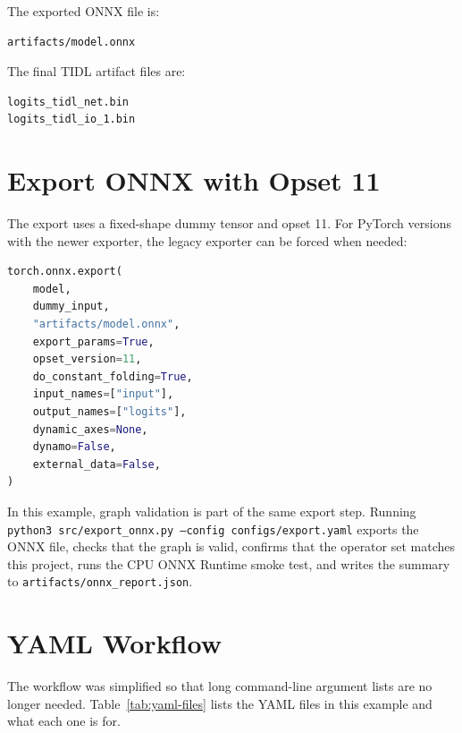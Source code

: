 \documentclass[11pt,a4paper]{article}
\begin{document}
The exported ONNX file is:

\begin{lstlisting}
artifacts/model.onnx
\end{lstlisting}

The final TIDL artifact files are:

\begin{lstlisting}
logits_tidl_net.bin
logits_tidl_io_1.bin
\end{lstlisting}

\section{Export ONNX with Opset 11}

The export uses a fixed-shape dummy tensor and opset 11.  For PyTorch versions with the newer exporter, the legacy exporter can be forced when needed:

\begin{lstlisting}[language=Python]
torch.onnx.export(
    model,
    dummy_input,
    "artifacts/model.onnx",
    export_params=True,
    opset_version=11,
    do_constant_folding=True,
    input_names=["input"],
    output_names=["logits"],
    dynamic_axes=None,
    dynamo=False,
    external_data=False,
)
\end{lstlisting}

In this example, graph validation is part of the same export step. Running \texttt{python3 src/export\_onnx.py --config configs/export.yaml} exports the ONNX file, checks that the graph is valid, confirms that the operator set matches this project, runs the CPU ONNX Runtime smoke test, and writes the summary to \texttt{artifacts/onnx\_report.json}.

\section{YAML Workflow}

The workflow was simplified so that long command-line argument lists are no longer needed.  Table~\ref{tab:yaml-files} lists the YAML files in this example and what each one is for.
\end{document}
